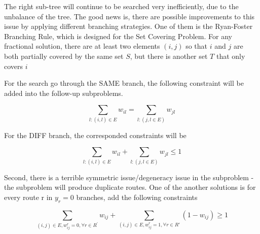         The right sub-tree will continue to be searched very inefficiently, due to the unbalance of the tree. The good news is, there are possible improvements to this issue by applying different branching strategies. One of them is the Ryan-Foster Branching Rule, which is designed for the Set Covering Problem. For any fractional solution, there are at least two elements $(i,j)$ so that $i$ and $j$ are both partially covered by the same set $S$, but there is another set $T$ that only covers $i$
        \begin{figure}[h!]
            \centering
        \end{figure}

        For the search go through the SAME branch, the following constraint will be added into the follow-up subproblems.

        \begin{equation*}
            \sum_{l: (i, l) \in E} w_{il} = \sum_{l: (j, l \in E)} w_{jl}
        \end{equation*}

        For the DIFF branch, the corresponded constraints will be

        \begin{equation*}
            \sum_{l: (i, l) \in E} w_{il} + \sum_{l: (j, l \in E)} w_{jl} \le 1
        \end{equation*}

        Second, there is a terrible symmetric issue/degeneracy issue in the subproblem - the subproblem will produce duplicate routes. One of the another solutions is for every route r in $y_r = 0$ branches, add the following constraints

        \begin{equation*}
            \sum_{(i, j) \in E, w_{ij}^r = 0, \forall r \in R^\prime} w_{ij} + \sum_{(i, j) \in E, w_{ij}^r = 1, \forall r \in R'} (1 - w_{ij}) \ge 1
        \end{equation*}

